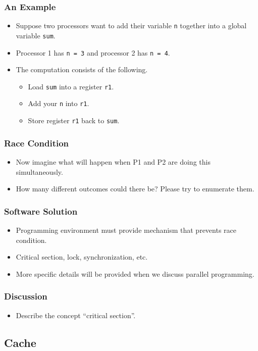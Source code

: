 \documentclass{beamer}
\begin{document}
\begin{CJK}{UTF8}{bsmi}
\begin{frame}
\frametitle{An Example}
\begin{itemize}
\item Suppose two processors want to add their variable {\tt n}
  together into a global variable {\tt sum}.  
\item Processor 1 has {\tt n = 3} and processor 2 has {\tt n = 4}.
\item The computation consists of the following.
  \begin{itemize}
  \item Load {\tt sum} into a register {\tt r1}.
  \item Add your {\tt n} into {\tt r1}.
  \item Store register {\tt r1} back to {\tt sum}.
  \end{itemize}
\end{itemize}
\end{frame}

\begin{frame}
\frametitle{Race Condition}
\begin{itemize}
\item Now imagine what will happen when P1 and P2 are doing this
  simultaneously.
\item How many different outcomes could there be?  Please try to
  enumerate them.
\end{itemize}
\end{frame}

\begin{frame}
\frametitle{Software Solution}
\begin{itemize}
\item Programming environment must provide mechanism that prevents
  race condition.
\item Critical section, lock, synchronization, etc.
\item More specific details will be provided when we discuss parallel
  programming.
\end{itemize}
\end{frame}


\begin{frame}
\frametitle{Discussion}
\begin{itemize}
\item Describe the concept ``critical section''.
\end{itemize}
\end{frame}


\subsection{Cache}


\end{CJK}
\end{document}
